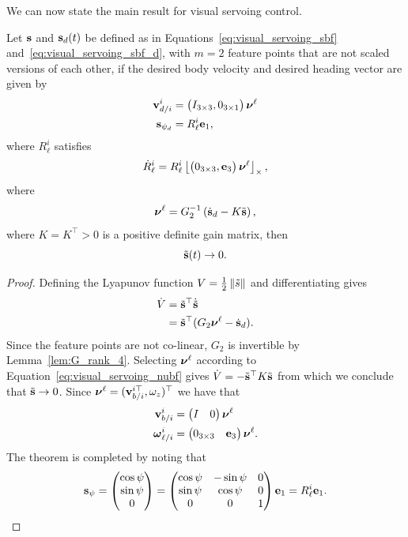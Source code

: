 We can now state the main result for visual servoing control.
\begin{theorem}
	Let $\mathbf{s}$ and $\mathbf{s}_d(t)$ be defined as in Equations~\eqref{eq:visual_servoing_sbf} and~\eqref{eq:visual_servoing_sbf_d}, with $m=2$ feature points that are not scaled versions of each other, if the desired body velocity and desired heading vector are given by
	\begin{align*}
	\mathbf{v}_{d/i}^i &= \begin{pmatrix} I_{3\times 3}, 0_{3\times 1} \end{pmatrix} \boldsymbol{\nu}^\ell \\
	\mathbf{s}_{\psi_d} &= R_\ell^i \mathbf{e}_1,
	\end{align*}
	where $R_\ell^i$ satisfies
	\[
	\dot{R}_\ell^i = R_\ell^i \left\lfloor \begin{pmatrix} 0_{3\times 3}, \mathbf{e}_3 \end{pmatrix}\boldsymbol{\nu}^\ell\right\rfloor_{\times},
	\]
	where
	\begin{equation}\label{eq:visual_servoing_nubf}
	\nubf^\ell = G_2^{-1}\left(\dot{\sbf}_d - K \tilde{\sbf}\right),
	\end{equation}
	where $K=K^\top>0$ is a positive definite gain matrix, then 
	\[
	\tilde{\mathbf{s}}(t) \to 0.
	\]
\end{theorem}
\begin{proof}
	Defining the Lyapunov function $V = \frac{1}{2}\left\|\tilde{s}\right\|$ and differentiating gives
	\begin{align*}
	\dot{V} &= \tilde{\mathbf{s}}^\top\dot{\tilde{\mathbf{s}}} \\
			&= \tilde{\mathbf{s}}^\top(G_2\boldsymbol{\nu}^\ell - \dot{\mathbf{s}}_d).
	\end{align*}
	Since the feature points are not co-linear, $G_2$ is invertible by Lemma~\ref{lem:G_rank_4}.  
	Selecting $\boldsymbol{\nu}^\ell$ according to Equation~\eqref{eq:visual_servoing_nubf}
	gives $\dot{V} = -\tilde{\mathbf{s}}^\top K \tilde{\mathbf{s}}$ from which we conclude that $\tilde{\mathbf{s}}\to 0$.
	Since $\boldsymbol{\nu}^\ell = (\mathbf{v}_{b/i}^{i\top}, \omega_z)^\top$ we have that
	\begin{align*}
	\mathbf{v}_{b/i}^i &= \begin{pmatrix} I & 0 \end{pmatrix} \boldsymbol{\nu}^\ell \\
	\boldsymbol{\omega}_{\ell/i}^i &= \begin{pmatrix} 0_{3\times 3} & \mathbf{e}_3 \end{pmatrix}\boldsymbol{\nu}^\ell.
	\end{align*}
    The theorem is completed by noting that 
    \[
    \mathbf{s}_{\psi} = \begin{pmatrix}\cos\psi \\ \sin\psi \\ 0 \end{pmatrix} = \begin{pmatrix} \cos\psi & -\sin\psi & 0 \\ \sin\psi & \cos\psi & 0 \\ 0 & 0 & 1 \end{pmatrix}\mathbf{e}_1 = R_\ell^i \mathbf{e}_1.
    \]
\end{proof}

